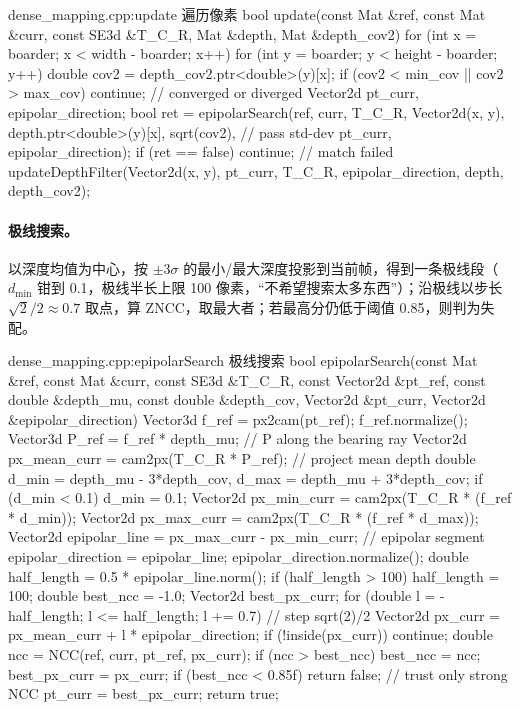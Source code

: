 \begin{codebox}[C++]{dense\_mapping.cpp:update 遍历像素}
bool update(const Mat &ref, const Mat &curr, const SE3d &T_C_R,
            Mat &depth, Mat &depth_cov2) {
  for (int x = boarder; x < width  - boarder; x++)
  for (int y = boarder; y < height - boarder; y++) {
    double cov2 = depth_cov2.ptr<double>(y)[x];
    if (cov2 < min_cov || cov2 > max_cov) continue;   // converged or diverged
    Vector2d pt_curr, epipolar_direction;
    bool ret = epipolarSearch(ref, curr, T_C_R, Vector2d(x, y),
                 depth.ptr<double>(y)[x], sqrt(cov2),  // pass std-dev
                 pt_curr, epipolar_direction);
    if (ret == false) continue;                        // match failed
    updateDepthFilter(Vector2d(x, y), pt_curr, T_C_R,
                      epipolar_direction, depth, depth_cov2);
  }
}
\end{codebox}

\paragraph{极线搜索。}
以深度均值为中心，按 $\pm 3\sigma$ 的最小/最大深度投影到当前帧，得到一条极线段（$d_{\min}$ 钳到 0.1，极线半长上限 100 像素，“不希望搜索太多东西”）；沿极线以步长 $\sqrt{2}/2\approx 0.7$ 取点，算 ZNCC，取最大者；若最高分仍低于阈值 0.85，则判为失配。

\begin{codebox}[C++]{dense\_mapping.cpp:epipolarSearch 极线搜索}
bool epipolarSearch(const Mat &ref, const Mat &curr, const SE3d &T_C_R,
    const Vector2d &pt_ref, const double &depth_mu, const double &depth_cov,
    Vector2d &pt_curr, Vector2d &epipolar_direction) {
  Vector3d f_ref = px2cam(pt_ref); f_ref.normalize();
  Vector3d P_ref = f_ref * depth_mu;                  // P along the bearing ray
  Vector2d px_mean_curr = cam2px(T_C_R * P_ref);      // project mean depth
  double d_min = depth_mu - 3*depth_cov, d_max = depth_mu + 3*depth_cov;
  if (d_min < 0.1) d_min = 0.1;
  Vector2d px_min_curr = cam2px(T_C_R * (f_ref * d_min));
  Vector2d px_max_curr = cam2px(T_C_R * (f_ref * d_max));
  Vector2d epipolar_line = px_max_curr - px_min_curr; // epipolar segment
  epipolar_direction = epipolar_line; epipolar_direction.normalize();
  double half_length = 0.5 * epipolar_line.norm();
  if (half_length > 100) half_length = 100;
  double best_ncc = -1.0; Vector2d best_px_curr;
  for (double l = -half_length; l <= half_length; l += 0.7) {  // step sqrt(2)/2
    Vector2d px_curr = px_mean_curr + l * epipolar_direction;
    if (!inside(px_curr)) continue;
    double ncc = NCC(ref, curr, pt_ref, px_curr);
    if (ncc > best_ncc) { best_ncc = ncc; best_px_curr = px_curr; }
  }
  if (best_ncc < 0.85f) return false;                 // trust only strong NCC
  pt_curr = best_px_curr; return true;
}
\end{codebox}


